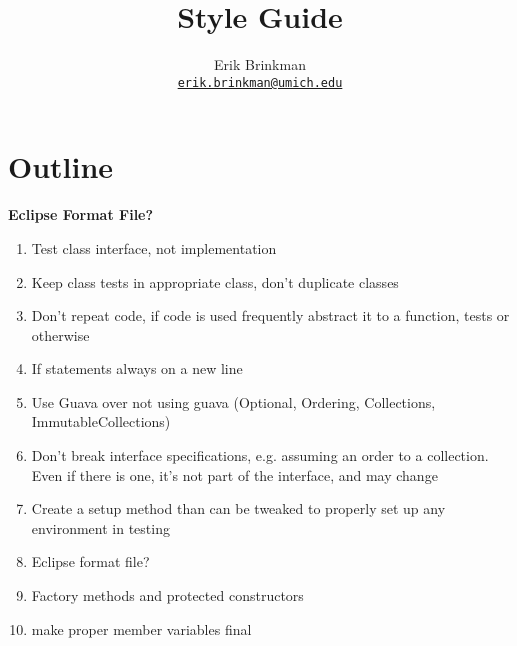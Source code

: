 \documentclass{article}
\newcommand{\email}[1]{\texttt{\href{mailto:#1}{#1}}}
\begin{document}
\title{Style Guide}
\author{Erik Brinkman \\ \email{erik.brinkman@umich.edu}}
\maketitle

\section{Outline}

\textbf{Eclipse Format File?}

\begin{enumerate}
\item Test class interface, not implementation
\item Keep class tests in appropriate class, don't duplicate classes
\item Don't repeat code, if code is used frequently abstract it to a function,
  tests or otherwise
\item If statements always on a new line
\item Use Guava over not using guava (Optional, Ordering, Collections,
  ImmutableCollections)
\item Don't break interface specifications, e.g. assuming an order to a
  collection. Even if there is one, it's not part of the interface, and may
  change
\item Create a setup method than can be tweaked to properly set up any
  environment in testing
\item Eclipse format file?
\item Factory methods and protected constructors
\item make proper member variables final
\end{enumerate}
\end{document}

